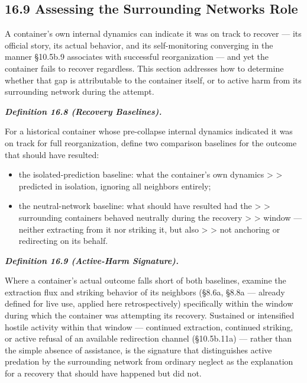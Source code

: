 \documentclass[
]{article}
\begin{document}
\hypertarget{assessing-the-surrounding-networks-role}{%
\subsection{16.9 Assessing the Surrounding Networks
Role}\label{assessing-the-surrounding-networks-role}}

A container's own internal dynamics can indicate it was on track to
recover --- its official story, its actual behavior, and its
self-monitoring converging in the manner §10.5b.9 associates with
successful reorganization --- and yet the container fails to recover
regardless. This section addresses how to determine whether that gap is
attributable to the container itself, or to active harm from its
surrounding network during the attempt.

\emph{\textbf{Definition 16.8 (Recovery Baselines).}}

For a historical container whose pre-collapse internal dynamics
indicated it was on track for full reorganization, define two comparison
baselines for the outcome that should have resulted:

\begin{itemize}
\item
  the isolated-prediction baseline: what the container's own dynamics
  \textgreater{} \textgreater{} predicted in isolation, ignoring all
  neighbors entirely;
\item
  the neutral-network baseline: what should have resulted had the
  \textgreater{} \textgreater{} surrounding containers behaved neutrally
  during the recovery \textgreater{} \textgreater{} window --- neither
  extracting from it nor striking it, but also \textgreater{}
  \textgreater{} not anchoring or redirecting on its behalf.
\end{itemize}

\emph{\textbf{Definition 16.9 (Active-Harm Signature).}}

Where a container's actual outcome falls short of both baselines,
examine the extraction flux and striking behavior of its neighbors
(§8.6a, §8.8a --- already defined for live use, applied here
retrospectively) specifically within the window during which the
container was attempting its recovery. Sustained or intensified hostile
activity within that window --- continued extraction, continued
striking, or active refusal of an available redirection channel
(§10.5b.11a) --- rather than the simple absence of assistance, is the
signature that distinguishes active predation by the surrounding network
from ordinary neglect as the explanation for a recovery that should have
happened but did not.
\end{document}
